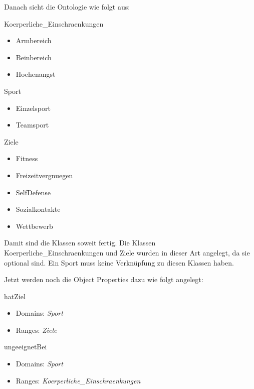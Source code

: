 Danach sieht die Ontologie wie folgt aus:
\begin{capitemize}
	\item Koerperliche\_Einschraenkungen
		\begin{itemize}
				\item Armbereich
				\item Beinbereich
				\item Hoehenangst
		\end{itemize}
	\item Sport
		\begin{itemize}
			\item Einzelsport
			\item Teamsport
		\end{itemize}
	\item Ziele
		\begin{itemize}
				\item Fitness
				\item Freizeitvergnuegen
				\item SelfDefense
				\item Sozialkontakte
				\item Wettbewerb
		\end{itemize}
\end{capitemize}

Damit sind die Klassen soweit fertig. Die Klassen Koerperliche\_Einschraenkungen und Ziele wurden in dieser Art angelegt, da sie optional sind. Ein Sport muss keine Verkn\"upfung zu diesen Klassen haben. 


Jetzt werden noch die Object Properties dazu wie folgt angelegt: 

\begin{capitemize}
	\item hatZiel
		\begin{itemize}
			\item Domains: \textit{Sport}
			\item Ranges: \textit{Ziele}
		\end{itemize}
	\item ungeeignetBei
		\begin{itemize}
			\item Domains: \textit{Sport}
			\item Ranges: \textit{Koerperliche\_Einschraenkungen}
		\end{itemize}
\end{capitemize}

